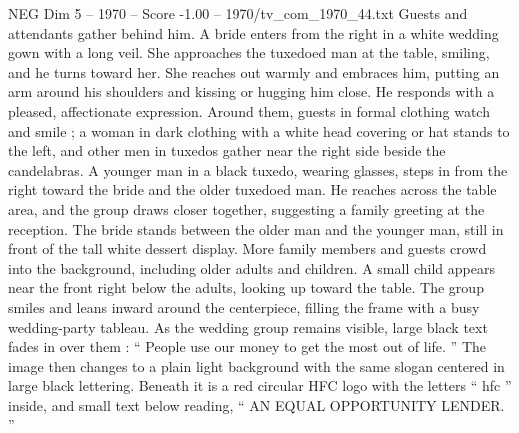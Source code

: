 \begin{textsample}{NEG Dim 5 – 1970 – Score -1.00 – 1970/tv\_com\_1970\_44.txt}
Guests and attendants gather behind him.
A bride enters from the right in a white wedding gown with a long veil.
She approaches the tuxedoed man at the table, smiling, and he turns toward her.
She reaches out warmly and embraces him, putting an arm around his shoulders and kissing or hugging him close.
He responds with a pleased, affectionate expression.
Around them, guests in formal clothing watch and smile ; a woman in dark clothing with a white head covering or hat stands to the left, and other men in tuxedos gather near the right side beside the candelabras.
A younger man in a black tuxedo, wearing glasses, steps in from the right toward the bride and the older tuxedoed man.
He reaches across the table area, and the group draws closer together, suggesting a family greeting at the reception.
The bride stands between the older man and the younger man, still in front of the tall white dessert display.
More family members and guests crowd into the background, including older adults and children.
A small child appears near the front right below the adults, looking up toward the table.
The group smiles and leans inward around the centerpiece, filling the frame with a busy wedding-party tableau.
As the wedding group remains visible, large black text fades in over them : “ People use our money to get the most out of life. ” The image then changes to a plain light background with the same slogan centered in large black lettering.
Beneath it is a red circular HFC logo with the letters “ hfc ” inside, and small text below reading, “ AN EQUAL OPPORTUNITY LENDER. ”

\end{textsample}
